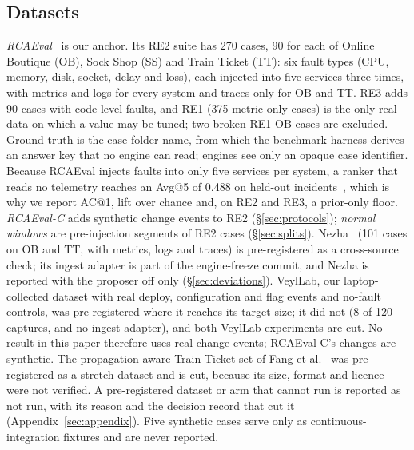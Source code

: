 \subsection{Datasets}
\label{sec:datasets}

\emph{RCAEval}~\cite{rcaeval2024} is our anchor.
Its RE2 suite has 270 cases, 90 for each of Online Boutique (OB), Sock Shop (SS) and Train Ticket (TT): six fault types (CPU, memory, disk, socket, delay and loss), each injected into five services three times, with metrics and logs for every system and traces only for OB and TT.
RE3 adds 90 cases with code-level faults, and RE1 (375 metric-only cases) is the only real data on which a value may be tuned; two broken RE1-OB cases are excluded.
Ground truth is the case folder name, from which the benchmark harness derives an answer key that no engine can read; engines see only an opaque case identifier.
Because RCAEval injects faults into only five services per system, a ranker that reads no telemetry reaches an Avg@5 of 0.488 on held-out incidents~\cite{buljic2026prior}, which is why we report AC@1, lift over chance and, on RE2 and RE3, a prior-only floor.
\emph{RCAEval-C} adds synthetic change events to RE2 (\S\ref{sec:protocols}); \emph{normal windows} are pre-injection segments of RE2 cases (\S\ref{sec:splits}).
Nezha~\cite{nezha2023} (101 cases on OB and TT, with metrics, logs and traces) is pre-registered as a cross-source check; its ingest adapter is part of the engine-freeze commit, and Nezha is reported with the proposer off only (\S\ref{sec:deviations}).
VeylLab, our laptop-collected dataset with real deploy, configuration and flag events and no-fault controls, was pre-registered where it reaches its target size; it did not (8 of 120 captures, and no ingest adapter), and both VeylLab experiments are cut.
No result in this paper therefore uses real change events; RCAEval-C's changes are synthetic.
The propagation-aware Train Ticket set of Fang et al.~\cite{fang2026rethinking} was pre-registered as a stretch dataset and is cut, because its size, format and licence were not verified.
A pre-registered dataset or arm that cannot run is reported as not run, with its reason and the decision record that cut it (Appendix~\ref{sec:appendix}).
Five synthetic cases serve only as continuous-integration fixtures and are never reported.


